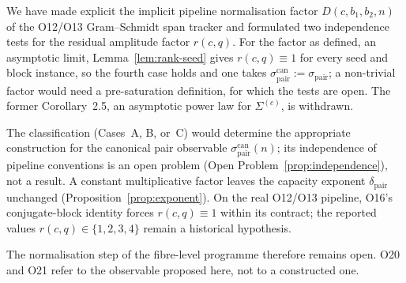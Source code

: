 \documentclass[11pt,a4paper]{article}
\theoremstyle{remark}
\newcommand{\dpair}{\delta_{\mathrm{pair}}}
\newcommand{\sigmapair}{\sigma_{\mathrm{pair}}}
\newcommand{\sigmacan}{\sigma_{\mathrm{pair}}^{\mathrm{can}}}
\newcommand{\rcq}{r(c,q)}
\begin{document}
  We have made explicit the implicit pipeline normalisation factor
  $D(c, b_{1}, b_{2}, n)$ of the O12/O13 Gram--Schmidt span tracker and
  formulated two independence tests for the residual amplitude factor $\rcq$.
  For the factor as defined, an asymptotic limit, Lemma~\ref{lem:rank-seed} gives $\rcq \equiv 1$
  for every seed and block instance, so the fourth case holds and one takes $\sigmacan := \sigmapair$; a
  non-trivial factor would need a pre-saturation definition, for which the tests are open.
  The former Corollary~2.5, an asymptotic power law for $\Sigma^{(c)}$, is withdrawn.

  The classification (Cases~A, B, or~C) would determine the appropriate
  construction for the canonical pair observable $\sigmacan(n)$; its independence
  of pipeline conventions is an open problem (Open Problem~\ref{prop:independence}), not a
  result.
  A constant multiplicative factor leaves the capacity exponent $\dpair$ unchanged
  (Proposition~\ref{prop:exponent}).
  On the real O12/O13 pipeline, O16's conjugate-block identity forces $\rcq \equiv 1$ within
  its contract; the reported values $\rcq \in \{1,2,3,4\}$ remain a historical hypothesis.

  The normalisation step of the fibre-level programme therefore remains open.
  O20 and O21 refer to the observable proposed here, not to a constructed one.

  \clearpage
  
      
\end{document}
